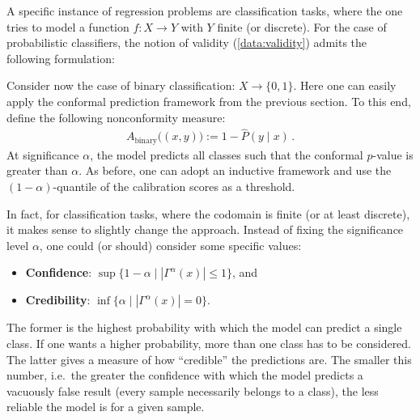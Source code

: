     A specific instance of regression problems are classification tasks, where the one tries to model a function $f:X\rightarrow Y$ with $Y$ finite (or discrete). For the case of probabilistic classifiers, the notion of validity (\cref{data:validity}) admits the following formulation:

    Consider now the case of binary classification: $X\rightarrow\{0,1\}$. Here one can easily apply the conformal prediction framework from the previous section. To this end, define the following nonconformity measure:
    \begin{gather}
        A_{\text{binary}}\bigl((x,y)\bigr) := 1 - \widehat{P}(y\mid x)\,.
    \end{gather}
    At significance $\alpha$, the model predicts all classes such that the conformal $p$-value is greater than $\alpha$. As before, one can adopt an inductive framework and use the $(1-\alpha)$-quantile of the calibration scores as a threshold.

    In fact, for classification tasks, where the codomain is finite (or at least discrete), it makes sense to slightly change the approach. Instead of fixing the significance level $\alpha$, one could (or should) consider some specific values:
    \begin{itemize}
        \item\textbf{Confidence}: $\sup\{1-\alpha\mid|\Gamma^\alpha(x)|\leq1\}$, and
        \item\textbf{Credibility}: $\inf\{\alpha\mid|\Gamma^\alpha(x)|=0\}$.
    \end{itemize}
    The former is the highest probability with which the model can predict a single class. If one wants a higher probability, more than one class has to be considered. The latter gives a measure of how ``credible'' the predictions are. The smaller this number, i.e.~the greater the confidence with which the model predicts a vacuously false result (every sample necessarily belongs to a class), the less reliable the model is for a given sample.

